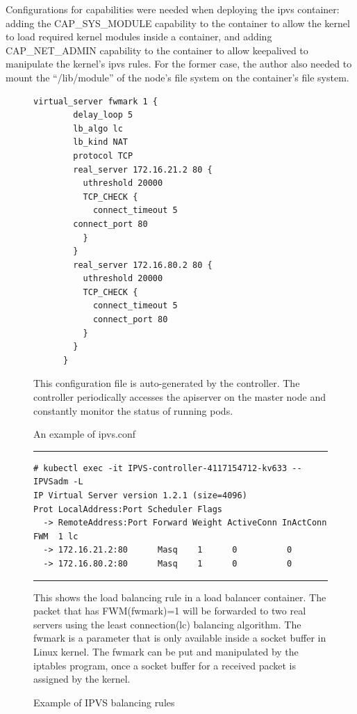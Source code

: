 Configurations for capabilities were needed when deploying the ipvs container: adding the CAP\_SYS\_MODULE capability 
to the container to allow the kernel to load required kernel modules inside a container, 
and adding CAP\_NET\_ADMIN capability to the container to allow keepalived to manipulate the kernel's ipvs rules. 
For the former case, the author also needed to mount the \enquote{/lib/module} of the node's file system on the container's file system.

\begin{figure}[h]
  \centering
  \begin{minipage}{0.7\columnwidth}
    \begin{lstlisting}[frame=single]
      virtual_server fwmark 1 {
        delay_loop 5
        lb_algo lc
        lb_kind NAT
        protocol TCP
        real_server 172.16.21.2 80 {
          uthreshold 20000
          TCP_CHECK {
            connect_timeout 5
        connect_port 80
          }
        }
        real_server 172.16.80.2 80 {
          uthreshold 20000
          TCP_CHECK {
            connect_timeout 5
            connect_port 80
          }
        }
      }
    \end{lstlisting}
  \end{minipage}

  \caption{An example of ipvs.conf}
  \label{fig:ipvs.conf}

  \begin{minipage}{0.9\columnwidth}
    This configuration file is auto-generated by the controller.
    The controller periodically accesses the apiserver on the master node and constantly monitor the status of running pods.
  \end{minipage}
\end{figure}

\begin{figure}[h]
  \centering
  \rule{\columnwidth}{0.4pt}
\begin{verbatim}
# kubectl exec -it IPVS-controller-4117154712-kv633 -- IPVSadm -L
IP Virtual Server version 1.2.1 (size=4096)
Prot LocalAddress:Port Scheduler Flags
  -> RemoteAddress:Port Forward Weight ActiveConn InActConn
FWM  1 lc
  -> 172.16.21.2:80      Masq    1      0          0         
  -> 172.16.80.2:80      Masq    1      0          0
\end{verbatim}
\rule{\columnwidth}{0.4pt}

\caption{Example of IPVS balancing rules}
\label{fig:IPVS rule}

\begin{minipage}{0.9\columnwidth}
  This shows the load balancing rule in a load balancer container.
  The packet that has FWM(fwmark)=1 will be forwarded to two real servers using the least connection(lc) balancing algorithm.
  The fwmark is a parameter that is only available inside a socket buffer in Linux kernel.
  The fwmark can be put and manipulated by the iptables program, once a socket buffer for a received packet is assigned by the kernel.
\end{minipage}
\end{figure}

